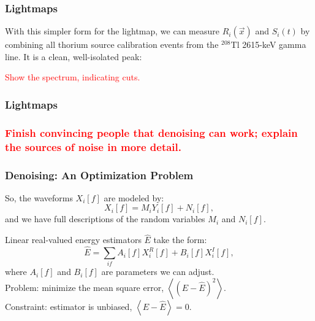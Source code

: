 \documentclass{beamer}
\begin{document}
\begin{frame}
\begin{center}
\frametitle{Lightmaps}
\end{center}
With this simpler form for the lightmap, we can measure $R_i(\vec{x})$ and $S_i(t)$ by combining all thorium source calibration events from the $^{208}$Tl 2615-keV gamma line.  It is a clean, well-isolated peak:

\textcolor{red}{Show the spectrum, indicating cuts.}
\end{frame}

\begin{frame}
\begin{center}
\frametitle{Lightmaps}
\end{center}
\end{frame}



\begin{frame}
\begin{center}
\frametitle{\textcolor{red}{Finish convincing people that denoising can work; explain the sources of noise in more detail.}}
\end{center}
\end{frame}


\begin{frame}
\begin{center}
\frametitle{Denoising: An Optimization Problem}
\end{center}
So, the waveforms $X_i[f]$ are modeled by:
\[X_i[f] = M_i Y_i[f] + N_i[f],\]
and we have full descriptions of the random variables $M_i$ and $N_i[f]$.

Linear real-valued energy estimators $\widehat{E}$ take the form:
\[\widehat{E} = \sum_{if} A_i[f] X^R_i[f] + B_i[f] X^I_i[f],\]
where $A_i[f]$ and $B_i[f]$ are parameters we can adjust.\\[0.5\baselineskip]

Problem: minimize the mean square error, $\left<\left(E-\widehat{E}\right)^2\right>$.\\[0.5\baselineskip]
Constraint:  estimator is unbiased, $\left<E-\widehat{E}\right>=0$.
\end{frame}
\end{document}
